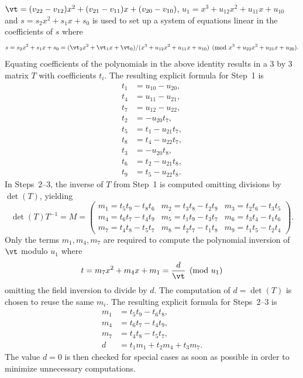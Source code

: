 $\vt = (v_{22} - v_{12})x^2 + (v_{21} - v_{11})x + (v_{20} - v_{10})$, $u_1 =
x^3 + u_{12}x^2 + u_{11}x + u_{10}$ and $s = s_2x^2 + s_1x + s_0$ is used to set
up a system of equations linear in the coefficients of $s$ where
$$s = s_2x^2 + s_1x + s_0 = (\vt_2x^2 + \vt_1x + \vt_0)/(x^3 + u_{12}x^2 +
u_{11}x + u_{10}) \pmod{x^3 + u_{22}x^2 + u_{21}x + u_{20}}.$$ Equating
coefficients of the polynomials in the above identity results in a 3 by 3
matrix $T$ with coefficients $t_i$. The resulting explicit formula for
Step~1 is
\begin{align*}
    t_1 &= u_{10} - u_{20},\\
    t_4 &= u_{11} - u_{21},\\
    t_7 &= u_{12} - u_{22},\\
    t_2 &= -u_{20}t_7,\\
    t_5 &= t_1 - u_{21}t_7,\\
    t_8 &= t_4 - u_{22}t_7,\\
    t_3 &= -u_{20}t_8,\\
    t_6 &= t_2 - u_{21}t_8,\\
    t_9 &= t_5 - u_{22}t_8.
\end{align*}
In Steps~2--3, the inverse of $T$ from Step~1 is computed omitting divisions by
$\det(T)$, yielding 
$$ \det(T)T^{-1} = M = \left( \begin{array}{ccc}
m_1 = t_5t_9 - t_8t_6 & m_2 = t_3t_8 - t_2t_9 & m_3 = t_2t_6 - t_3t_5  \\
m_4 = t_6t_7 - t_4t_9 & m_5 = t_1t_9 - t_3t_7 & m_6 = t_3t_4 - t_1t_6  \\
m_7 = t_4t_8 - t_5t_7 & m_8 = t_2t_7 - t_1t_8 & m_9 = t_1t_5 - t_2t_4
\end{array} \right).$$ Only the terms $m_1,m_4,m_7$ are required to compute the
polynomial inversion of $\vt$ modulo $u_1$ where $$ t = m_7x^2 + m_4x + m_1 =
\frac{d}{\vt} \pmod{u_1}$$ omitting the field inversion to divide by $d$. The
computation of $d = \det(T)$ is chosen to reuse the same $m_i$. The resulting
explicit formula for Steps~2--3 is
\begin{align*}
    m_1 &= t_5t_9 - t_6t_8,\\
    m_4 &= t_6t_7 - t_4t_9,\\
    m_7 &= t_4t_8 - t_5t_7,\\
    d   &= t_1m_1 + t_2m_4 + t_3m_7. 
\end{align*} 
The value $d = 0$ is then checked for special cases as soon as possible in order
to minimize unnecessary computations. 

